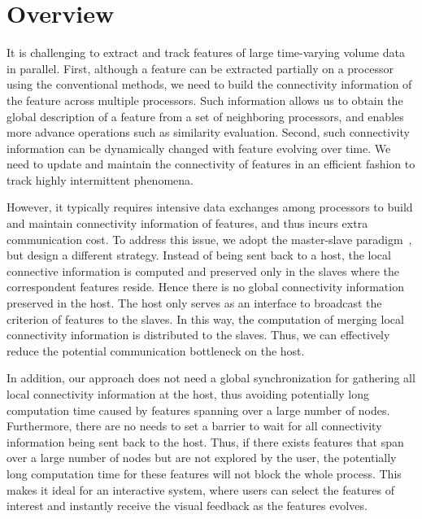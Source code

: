 \section{Overview}

It is challenging to extract and track features of large time-varying volume data in parallel. First, although a feature can be extracted partially on a processor using the conventional methods, we need to build the connectivity information of the feature across multiple processors. Such information allows us to obtain the global description of a feature from a set of neighboring processors, and enables more advance operations such as similarity evaluation. Second, such connectivity information can be dynamically changed with feature evolving over time. We need to update and maintain the connectivity of features in an efficient fashion to track highly intermittent phenomena.


However, it typically requires intensive data exchanges among processors to build and maintain connectivity information of features, and thus incurs extra communication cost. To address this issue, we adopt the master-slave paradigm~\cite{Chen03realtime}, but design a different strategy. Instead of being sent back to a host, the local connective information is computed and preserved only in the slaves where the correspondent features reside. Hence there is no global connectivity information preserved in the host. The host only serves as an interface to broadcast the criterion of features to the slaves. In this way, the computation of merging local connectivity information is distributed to the slaves. Thus, we can effectively reduce the potential communication bottleneck on the host.

In addition, our approach does not need a global synchronization for gathering all local connectivity information at the host, thus avoiding potentially long computation time caused by features spanning over a large number of nodes. Furthermore, there are no needs to set a barrier to wait for all connectivity information being sent back to the host. Thus, if there exists features that span over a large number of nodes but are not explored by the user, the potentially long computation time for these features will not block the whole process. This makes it ideal for an interactive system, where users can select the features of interest and instantly receive the visual feedback as the features evolves.

